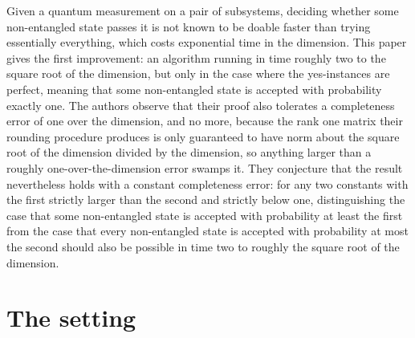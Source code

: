 \documentclass{conjura-conjecture}
\begin{document}

\vspace{0.4em}

\begin{informalconjecture}
Given a quantum measurement on a pair of subsystems, deciding whether
some non-entangled state passes it is not known to be doable faster than
trying essentially everything, which costs exponential time in the
dimension. This paper gives the first improvement: an algorithm running
in time roughly two to the square root of the dimension, but only in the
case where the yes-instances are perfect, meaning that some
non-entangled state is accepted with probability exactly one. The
authors observe that their proof also tolerates a completeness error of
one over the dimension, and no more, because the rank one matrix their
rounding procedure produces is only guaranteed to have norm about the
square root of the dimension divided by the dimension, so anything
larger than a roughly one-over-the-dimension error swamps it. They
conjecture that the result nevertheless holds with a constant
completeness error: for any two constants with the first strictly larger
than the second and strictly below one, distinguishing the case that
some non-entangled state is accepted with probability at least the first
from the case that every non-entangled state is accepted with
probability at most the second should also be possible in time two to
roughly the square root of the dimension.
\end{informalconjecture}

\section{The setting}\label{sec:setting}
\end{document}

